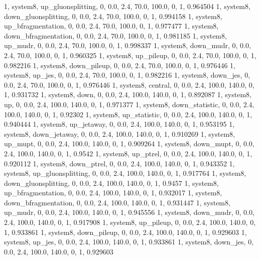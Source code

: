 1, system8, up_gluonsplitting, 0, 0.0, 2.4, 70.0, 100.0, 0, 1, 0.964504
1, system8, down_gluonsplitting, 0, 0.0, 2.4, 70.0, 100.0, 0, 1, 0.994158
1, system8, up_bfragmentation, 0, 0.0, 2.4, 70.0, 100.0, 0, 1, 0.977477
1, system8, down_bfragmentation, 0, 0.0, 2.4, 70.0, 100.0, 0, 1, 0.981185
1, system8, up_mudr,         0, 0.0, 2.4, 70.0, 100.0, 0, 1, 0.998337
1, system8, down_mudr,       0, 0.0, 2.4, 70.0, 100.0, 0, 1, 0.960325
1, system8, up_pileup,       0, 0.0, 2.4, 70.0, 100.0, 0, 1, 0.982216
1, system8, down_pileup,     0, 0.0, 2.4, 70.0, 100.0, 0, 1, 0.976446
1, system8, up_jes,          0, 0.0, 2.4, 70.0, 100.0, 0, 1, 0.982216
1, system8, down_jes,        0, 0.0, 2.4, 70.0, 100.0, 0, 1, 0.976446
1, system8, central,    0, 0.0, 2.4, 100.0, 140.0, 0, 1, 0.931732
1, system8, down,       0, 0.0, 2.4, 100.0, 140.0, 0, 1, 0.892087
1, system8, up,         0, 0.0, 2.4, 100.0, 140.0, 0, 1, 0.971377
1, system8, down_statistic,       0, 0.0, 2.4, 100.0, 140.0, 0, 1, 0.92302
1, system8, up_statistic,         0, 0.0, 2.4, 100.0, 140.0, 0, 1, 0.940444
1, system8, up_jetaway,      0, 0.0, 2.4, 100.0, 140.0, 0, 1, 0.953195
1, system8, down_jetaway,    0, 0.0, 2.4, 100.0, 140.0, 0, 1, 0.910269
1, system8, up_mupt,         0, 0.0, 2.4, 100.0, 140.0, 0, 1, 0.909264
1, system8, down_mupt,       0, 0.0, 2.4, 100.0, 140.0, 0, 1, 0.9542
1, system8, up_ptrel,        0, 0.0, 2.4, 100.0, 140.0, 0, 1, 0.920112
1, system8, down_ptrel,      0, 0.0, 2.4, 100.0, 140.0, 0, 1, 0.943352
1, system8, up_gluonsplitting, 0, 0.0, 2.4, 100.0, 140.0, 0, 1, 0.917764
1, system8, down_gluonsplitting, 0, 0.0, 2.4, 100.0, 140.0, 0, 1, 0.9457
1, system8, up_bfragmentation, 0, 0.0, 2.4, 100.0, 140.0, 0, 1, 0.932017
1, system8, down_bfragmentation, 0, 0.0, 2.4, 100.0, 140.0, 0, 1, 0.931447
1, system8, up_mudr,         0, 0.0, 2.4, 100.0, 140.0, 0, 1, 0.945556
1, system8, down_mudr,       0, 0.0, 2.4, 100.0, 140.0, 0, 1, 0.917908
1, system8, up_pileup,       0, 0.0, 2.4, 100.0, 140.0, 0, 1, 0.933861
1, system8, down_pileup,     0, 0.0, 2.4, 100.0, 140.0, 0, 1, 0.929603
1, system8, up_jes,          0, 0.0, 2.4, 100.0, 140.0, 0, 1, 0.933861
1, system8, down_jes,        0, 0.0, 2.4, 100.0, 140.0, 0, 1, 0.929603
